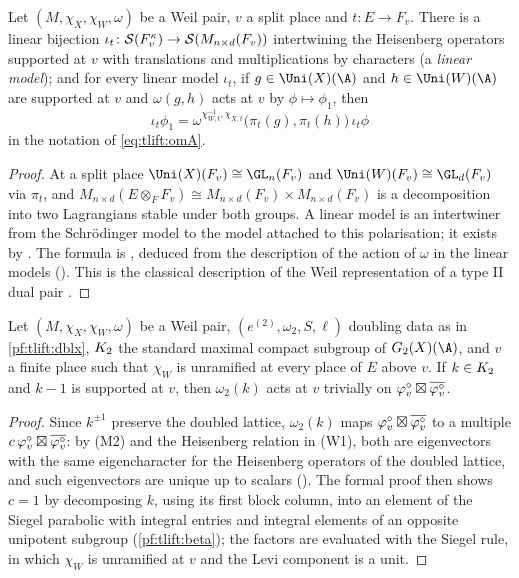 \begin{proposition}\label{pf:tlift:split}
Let $(M,\chi_X,\chi_W,\omega)$ be a Weil pair, $v$ a split place and $t\colon E\to F_v$. There is a linear
bijection $\iota_t\colon\mathcal{S}(F_v^\kappa)\to\mathcal{S}(M_{n\times d}(F_v))$ intertwining the Heisenberg operators
supported at $v$ with translations and multiplications by characters (a \emph{linear model}); and for
every linear model $\iota_t$, if $g\in\Uni(X)(\A)$ and $h\in\Uni(W)(\A)$ are supported at $v$ and $\omega(g,h)$ acts at
$v$ by $\phi\mapsto\phi_1$, then
\[
  \iota_t\phi_1=\omega^{\chi_{W,t}^{-1},\chi_{X,t}}\bigl(\pi_t(g),\pi_t(h)\bigr)\,\iota_t\phi
\]
in the notation of \eqref{eq:tlift:omA}.
\end{proposition}

\begin{proof}
At a split place $\Uni(X)(F_v)\cong\GL_n(F_v)$ and $\Uni(W)(F_v)\cong\GL_d(F_v)$ via $\pi_t$, and
$M_{n\times d}(E\otimes_FF_v)\cong M_{n\times d}(F_v)\times M_{n\times d}(F_v)$ is a decomposition into two Lagrangians
stable under both groups. A linear model is an intertwiner from the Schr\"odinger model to the model
attached to this polarisation; it exists by . The formula is
, deduced from the description of the action of $\omega$ in the
linear models (). This is the classical description of the
Weil representation of a type II dual pair \cite{MoeglinVignerasWaldspurger1987,Minguez2008}.
\end{proof}

\begin{proposition}\label{pf:tlift:vacfix}
Let $(M,\chi_X,\chi_W,\omega)$ be a Weil pair, $(e^{(2)},\omega_2,S,\ell)$ doubling data as in \cref{pf:tlift:dblx},
$K_2$ the standard maximal compact subgroup of $G_2(X)(\A)$, and $v$ a finite place such that $\chi_W$ is
unramified at every place of $E$ above $v$. If $k\in K_2$ and $k-1$ is supported at $v$, then $\omega_2(k)$
acts at $v$ trivially on $\varphi^{\circ}_v\boxtimes\overline{\varphi^{\circ}_v}$.
\end{proposition}

\begin{proof}
Since $k^{\pm1}$ preserve the doubled lattice, $\omega_2(k)$ maps $\varphi^{\circ}_v\boxtimes\overline{\varphi^{\circ}_v}$ to a
multiple $c\,\varphi^{\circ}_v\boxtimes\overline{\varphi^{\circ}_v}$: by (M2) and the Heisenberg relation in (W1), both are
eigenvectors with the same eigencharacter for the Heisenberg operators of the doubled lattice, and such
eigenvectors are unique up to scalars (). The formal
proof then shows $c=1$ by decomposing $k$, using its first block column, into an element of the Siegel
parabolic with integral entries and integral elements of an opposite unipotent subgroup
(\cref{pf:tlift:beta}); the factors are evaluated with the Siegel rule, in
which $\chi_W$ is unramified at $v$ and the Levi component is a unit.
\end{proof}

